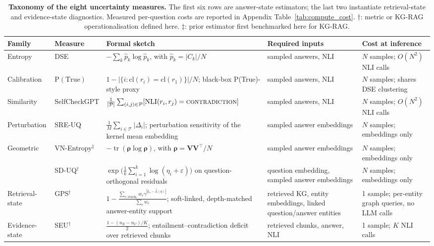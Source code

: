 \begin{table}[t]
\centering
\small
\caption{%
  \textbf{Taxonomy of the eight uncertainty measures.}
  The first six rows are answer-state estimators; the last two instantiate
  retrieval-state and evidence-state diagnostics.
  Measured per-question costs are reported in Appendix
  Table~\ref{tab:compute_cost}.
  $\dagger$: metric or KG-RAG operationalisation defined here.
  $\ddagger$: prior estimator first benchmarked here for KG-RAG.%
}
\label{tab:metric_taxonomy}
\begin{tabular}{@{}llp{5.2cm}p{2.9cm}p{2.7cm}@{}}
\toprule
\textbf{Family} & \textbf{Measure} & \textbf{Formal sketch} & \textbf{Required inputs} & \textbf{Cost at inference} \\
\midrule
Entropy
  & DSE
  & $-\sum_k \hat{p}_k \log \hat{p}_k$, with $\hat{p}_k = |C_k|/N$
  & sampled answers, NLI
  & $N$ samples; $O(N^2)$ NLI calls \\
\midrule
Calibration
  & $\mathrm{P(True)}$
  & $1 - |\{i:\mathrm{cl}(r_i)=\mathrm{cl}(r_1)\}|/N$; black-box P(True)-style proxy
  & sampled answers, NLI
  & $N$ samples; shares DSE clustering \\
\midrule
Similarity
  & SelfCheckGPT
  & $\frac{1}{|\mathcal{P}|}\sum_{(i,j)\in\mathcal{P}}
      [\mathrm{NLI}(r_i,r_j)=\textsc{contradiction}]$
  & sampled answers, NLI
  & $N$ samples; $O(N^2)$ NLI calls \\
\midrule
Perturbation
  & SRE-UQ
  & $\frac{1}{M}\sum_{i\in\mathcal{T}}|\Delta_i|$; perturbation sensitivity of the kernel mean embedding
  & sampled answer embeddings
  & $N$ samples; embeddings only \\
\midrule
\multirow{2}{*}{Geometric}
  & VN-Entropy$^{\ddagger}$
  & $-\operatorname{tr}(\bm{\rho}\log\bm{\rho})$, with $\bm{\rho}=\bm{V}\bm{V}^\top/N$
  & sampled answer embeddings
  & $N$ samples; embeddings only \\
  & SD-UQ$^\dagger$
  & $\exp\!\bigl(\frac{1}{k}\sum_{i=1}^k \log(\eta_i+\varepsilon)\bigr)$ on question-orthogonal residuals
  & question embedding, sampled answer embeddings
  & $N$ samples; embeddings only \\
\midrule
Retrieval-state
  & GPS$^\dagger$
  & $\displaystyle 1 -
     \frac{\sum_{e:\mathrm{reach}_e} w_e \gamma^{|L_e-\hat L(q)|}}
          {\sum_e w_e}$; soft-linked, depth-matched answer-entity support
  & retrieved KG, entity embeddings, linked question/answer entities
  & 1 sample; per-entity graph queries, no LLM calls \\
\midrule
Evidence-state
  & SEU$^\dagger$
  & $\frac{1 - (n_E-n_C)/K}{2}$; entailment--contradiction deficit over retrieved chunks
  & retrieved chunks, answer, NLI
  & 1 sample; $K$ NLI calls \\
\bottomrule
\end{tabular}
\end{table}

